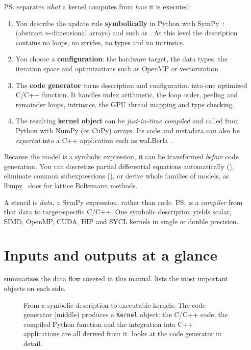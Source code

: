 \ps{} separates \emph{what} a kernel computes from \emph{how} it is executed:
\begin{enumerate}
  \item You describe the update rule \textbf{symbolically} in Python with
        SymPy~\cite{sympy}:  (abstract $n$-dimensional arrays) and
         such as .
        At this level the description contains no loops, no strides, no types and no
        intrinsics.
  \item You choose a \textbf{configuration}: the hardware target, the data types, the
        iteration space and optimizations such as OpenMP or vectorization.
  \item The \textbf{code generator}  turns description and
        configuration into one optimized C/C++ function. It handles index arithmetic,
        the loop order, peeling and remainder loops, intrinsics, the GPU thread mapping
        and type checking.
  \item The resulting \textbf{kernel object} can be \emph{just-in-time compiled} and
        called from Python with NumPy (or CuPy) arrays. Its code and metadata can also be
        \emph{exported} into a C++ application such as waLBerla~\cite{walberla}.
\end{enumerate}
Because the model is a symbolic expression, it can be transformed \emph{before} code
generation. You can discretize partial differential equations automatically
(), eliminate common subexpressions (), or derive whole
families of models, as lbmpy~\cite{lbmpy} does for lattice Boltzmann methods.

\begin{keyidea}
  A stencil is \emph{data}, a SymPy expression, rather than code. \ps{} is a
  \emph{compiler} from that data to target-specific C/C++. One symbolic description
  yields scalar, SIMD, OpenMP, CUDA, HIP and SYCL kernels in single or double precision.
\end{keyidea}

\section{Inputs and outputs at a glance}

 summarizes the data flow covered in this manual.
 lists the most important objects on each side.

\begin{figure}[htbp]
  \centering
  
  \caption[From a symbolic description to executable kernels]{From a symbolic
    description to executable kernels. The code generator (middle) produces a
    \texttt{Kernel} object; the C/C++ code, the compiled Python function and the
    integration into C++ applications are all derived from it. 
    looks at the code generator in detail.}
  \label{fig:big-picture}
\end{figure}

